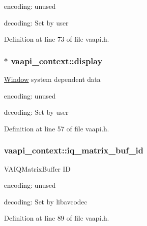 \begin{DoxyItemize}
\item encoding\+: unused
\item decoding\+: Set by user 
\end{DoxyItemize}

Definition at line 73 of file vaapi.\+h.

\subsubsection[{\texorpdfstring{display}{display}}]{$\ast$ vaapi\+\_\+context\+::display}\hypertarget{structvaapi__context_ad16240a71f568ffdb98dc7cc7d231180}{}\label{structvaapi__context_ad16240a71f568ffdb98dc7cc7d231180}
\hyperlink{class_window}{Window} system dependent data


\begin{DoxyItemize}
\item encoding\+: unused
\item decoding\+: Set by user 
\end{DoxyItemize}

Definition at line 57 of file vaapi.\+h.

\subsubsection[{\texorpdfstring{iq\+\_\+matrix\+\_\+buf\+\_\+id}{iq_matrix_buf_id}}]{ vaapi\+\_\+context\+::iq\+\_\+matrix\+\_\+buf\+\_\+id}\hypertarget{structvaapi__context_a0182841a5d2ad71f35257f97eb9a2ebc}{}\label{structvaapi__context_a0182841a5d2ad71f35257f97eb9a2ebc}
V\+A\+I\+Q\+Matrix\+Buffer ID


\begin{DoxyItemize}
\item encoding\+: unused
\item decoding\+: Set by libavcodec 
\end{DoxyItemize}

Definition at line 89 of file vaapi.\+h.


